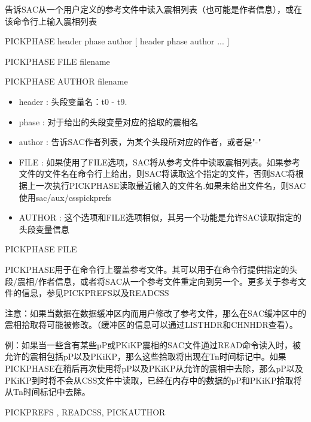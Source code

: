 \label{cmd:pickphase}

告诉SAC从一个用户定义的参考文件中读入震相列表（也可能是作者信息），或在该命令行上输入震相列表

PICKPHASE header phase author [ header phase author ... ]

PICKPHASE FILE {filename}

PICKPHASE AUTHOR {filename}

\begin{itemize}
\item header : 头段变量名：t0 - t9. 
\item phase : 对于给出的头段变量对应的拾取的震相名 
\item author : 告诉SAC作者列表，为某个头段所对应的作者，或者是"-" 
\item FILE : 如果使用了FILE选项，SAC将从参考文件中读取震相列表。如果参考文件的文件名在命令行上给出，则SAC将读取这个指定的文件，否则SAC将根据上一次执行PICKPHASE读取最近输入的文件名.如果未给出文件名，则SAC使用sac/aux/csspickprefs 
\item AUTHOR : 这个选项和FILE选项相似，其另一个功能是允许SAC读取指定的头段变量信息
\end{itemize}

PICKPHASE FILE

PICKPHASE用于在命令行上覆盖参考文件。其可以用于在命令行提供指定的头段/震相/作者信息，或者将SAC从一个参考文件重定向到另一个。更多关于参考文件的信息，参见PICKPREFS以及READCSS

注意：如果当数据在数据缓冲区内而用户修改了参考文件，那么在SAC缓冲区中的震相拾取将可能被修改。（缓冲区的信息可以通过LISTHDR和CHNHDR查看）。

例：如果当一些含有某些pP或PKiKP震相的SAC文件通过READ命令读入时，被允许的震相包括pP以及PKiKP，那么这些拾取将出现在Tn时间标记中。如果PICKPHASE在稍后再次使用将pP以及PKiKP从允许的震相中去除，那么pP以及PKiKP到时将不会从CSS文件中读取，已经在内存中的数据的pP和PKiKP拾取将从Tn时间标记中去除。

PICKPREFS , READCSS, PICKAUTHOR
